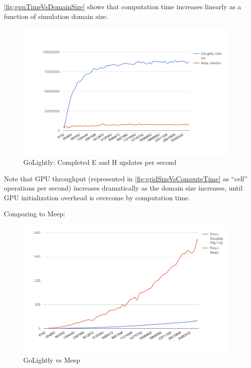 \autoref{fig:gpuTimeVsDomainSize} shows that computation time increases linearly as a function of simulation domain size.


\begin{figure}[H]
	\centering
	\includegraphics[width=\textwidth,
	keepaspectratio]{cells-per-second.png}
	\caption{GoLightly: Completed E and H updates per second}
	\label{fig:gridSizeVsComputeTime}
\end{figure}

Note that GPU throughput (represented in \autoref{fig:gridSizeVsComputeTime} as “cell” operations per second) increases dramatically as the domain size increases, until GPU initialization overhead is overcome by computation time.

Comparing to Meep:

\begin{figure}[H]
	\centering
	\includegraphics[width=\textwidth,
	keepaspectratio]{gpu-vs-meep.png}
	\caption{GoLightly vs Meep}
	\label{fig:gpuVsMeep}
\end{figure}

